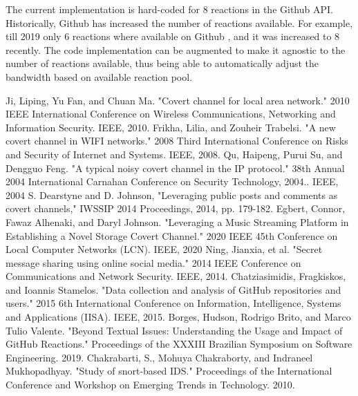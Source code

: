 \documentclass[conference]{IEEEtran}
\begin{document}
The current implementation is hard-coded for 8 reactions in the Github API. Historically, Github has increased the number of reactions available. For example, till 2019 only 6 reactions where available on Github \cite{b8}, and it was increased to 8 recently. The code implementation can be augmented to make it agnostic to the number of reactions available, thus being able to automatically adjust the bandwidth based on available reaction pool.


\begin{thebibliography}{00}
Ji, Liping, Yu Fan, and Chuan Ma. "Covert channel for local area network." 2010 IEEE International Conference on Wireless Communications, Networking and Information Security. IEEE, 2010. 
 Frikha, Lilia, and Zouheir Trabelsi. "A new covert channel in WIFI networks." 2008 Third International Conference on Risks and Security of Internet and Systems. IEEE, 2008.
 Qu, Haipeng, Purui Su, and Dengguo Feng. "A typical noisy covert channel in the IP protocol." 38th Annual 2004 International Carnahan Conference on Security Technology, 2004.. IEEE, 2004
 S. Dearstyne and D. Johnson, "Leveraging public posts and comments as covert channels," IWSSIP 2014 Proceedings, 2014, pp. 179-182.
 Egbert, Connor, Fawaz Alhenaki, and Daryl Johnson. "Leveraging a Music Streaming Platform in Establishing a Novel Storage Covert Channel." 2020 IEEE 45th Conference on Local Computer Networks (LCN). IEEE, 2020
 Ning, Jianxia, et al. "Secret message sharing using online social media." 2014 IEEE Conference on Communications and Network Security. IEEE, 2014.
Chatziasimidis, Fragkiskos, and Ioannis Stamelos. "Data collection and analysis of GitHub repositories and users." 2015 6th International Conference on Information, Intelligence, Systems and Applications (IISA). IEEE, 2015.
Borges, Hudson, Rodrigo Brito, and Marco Tulio Valente. "Beyond Textual Issues: Understanding the Usage and Impact of GitHub Reactions." Proceedings of the XXXIII Brazilian Symposium on Software Engineering. 2019.
 Chakrabarti, S., Mohuya Chakraborty, and Indraneel Mukhopadhyay. "Study of snort-based IDS." Proceedings of the International Conference and Workshop on Emerging Trends in Technology. 2010.
\end{thebibliography}
\end{document}

